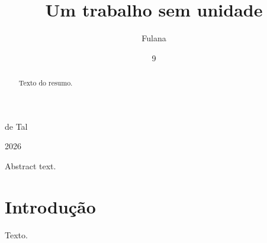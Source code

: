 \documentclass[dsc]{ufrj}
\begin{document}
\title{Um trabalho sem unidade}
\author{Fulana}{de Tal}
\date{9}{2026}
\maketitle
\frontmatter
\begin{abstract}
Texto do resumo.
\end{abstract}
\begin{foreignabstract}
Abstract text.
\end{foreignabstract}
\mainmatter
\chapter{Introdução}
Texto.
\ufrjfinalpage
\end{document}
